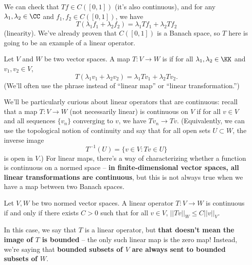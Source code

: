 We can check that $Tf \in C([0, 1])$ (it's also continuous), and for any $\lambda_1, \lambda_2 \in \CC$ and $f_1, f_2 \in C([0, 1])$, we have 
\[
    T(\lambda_1 f_1 + \lambda_2 f_2) = \lambda_1 Tf_1 + \lambda_2 Tf_2
\]
(linearity). We've already proven that $C([0, 1])$ is a Banach space, so $T$ here is going to be an example of a linear operator. 

\begin{definition}
Let $V$ and $W$ be two vector spaces. A map $T: V \to W$ is  if for all $\lambda_1, \lambda_2 \in \KK$ and $v_1, v_2 \in V$, 
\[
    T(\lambda_1v_1 + \lambda_2v_2) = \lambda_1 Tv_1 + \lambda_2 Tv_2.
\]
(We'll often use the phrase  instead of ``linear map'' or ``linear transformation.'')
\end{definition}

We'll be particularly curious about linear operators that are continuous: recall that a map $T: V \to W$ (not necessarily linear) is continuous on $V$ if for all $v \in V$ and all sequences $\{v_n\}$ converging to $v$, we have $Tv_n \to Tv$. (Equivalently, we can use the topological notion of continuity and say that for all open sets $U \subset W$, the inverse image
\[
    T^{-1}(U) = \{v \in V: Tv \in U\}
\]
is open in $V$.) For linear maps, there's a way of characterizing whether a function is continuous on a normed space -- \textbf{in finite-dimensional vector spaces, all linear transformations are continuous}, but this is not always true when we have a map between two Banach spaces. 

\begin{theorem}
Let $V, W$ be two normed vector spaces. A linear operator $T: V \to W$ is continuous if and only if there exists $C > 0$ such that for all $v \in V$, $||Tv||_W \le C||v||_V$. 
\end{theorem}

In this case, we say that $T$ is a  linear operator, but \textbf{that doesn't mean the image of $T$ is bounded} -- the only such linear map is the zero map! Instead, we're saying that \textbf{bounded subsets of $V$ are always sent to bounded subsets of $W$}.

